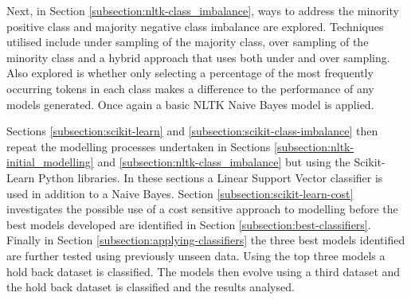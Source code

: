 Next, in Section \ref{subsection:nltk-class_imbalance}, ways to address the minority positive class and majority negative class imbalance are explored. Techniques utilised include under sampling of the majority class, over sampling of the minority class and a hybrid approach that uses both under and over sampling. Also explored is whether only selecting a percentage of the most frequently occurring tokens in each class makes a difference to the performance of any models generated. Once again a basic NLTK Naive Bayes model is applied.

Sections \ref{subsection:scikit-learn} and \ref{subsection:scikit-class-imbalance} then repeat the modelling processes undertaken in Sections \ref{subsection:nltk-initial_modelling} and \ref{subsection:nltk-class_imbalance} but using the Scikit-Learn Python libraries. In these sections a Linear Support Vector classifier is used in addition to a Naive Bayes. Section \ref{subsection:scikit-learn-cost} investigates the possible use of a cost sensitive approach to modelling before the best models developed are identified in Section \ref{subsection:best-classifiers}. Finally in Section \ref{subsection:applying-classifiers} the three best models identified are further tested using previously unseen data. Using the top three models a hold back dataset is classified. The models then evolve using a third dataset and the hold back dataset is classified and the results analysed.